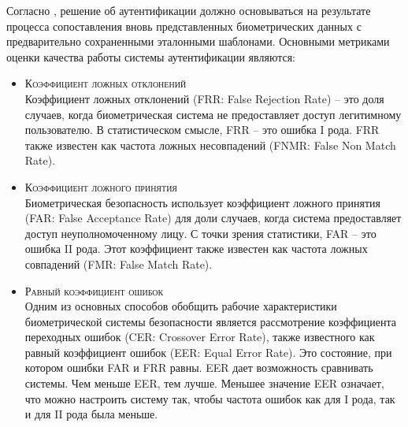 \documentclass[12pt]{article}
\begin{document}
    \par Согласно \cite{BiometricRecognition, BoiometricSecurity}, решение об аутентификации должно основываться на результате процесса сопоставления вновь представленных биометрических данных с предварительно сохраненными эталонными шаблонами. Основными метриками оценки качества работы системы аутентификации являются:

    \begin{itemize}
        \item \textsc{Коэффициент ложных отклонений} \\
        Коэффициент ложных отклонений (FRR: False Rejection Rate) -- это доля случаев, когда биометрическая система не предоставляет доступ легитимному пользователю. В статистическом смысле, FRR -- это ошибка I рода. FRR также известен как частота ложных несовпадений (FNMR: False Non Match Rate).

        \item \textsc{Коэффициент ложного принятия} \\
        Биометрическая безопасность использует коэффициент ложного принятия (FAR: False Acceptance Rate) для доли случаев, когда система предоставляет доступ неуполномоченному лицу. С точки зрения статистики, FAR -- это ошибка II рода. Этот коэффициент также известен как частота ложных совпадений (FMR: False Match Rate).

        \item \textsc{Равный коэффициент ошибок} \\
        Одним из основных способов обобщить рабочие характеристики биометрической системы безопасности является рассмотрение коэффициента переходных ошибок (CER: Crossover Error Rate), также известного как равный коэффициент ошибок (EER: Equal Error Rate). Это состояние, при котором ошибки FAR и FRR равны. EER дает возможность сравнивать системы. Чем меньше EER, тем лучше. Меньшее значение EER означает, что можно настроить систему так, чтобы частота ошибок как для I рода, так и для II рода была меньше.
    \end{itemize}
\end{document}
